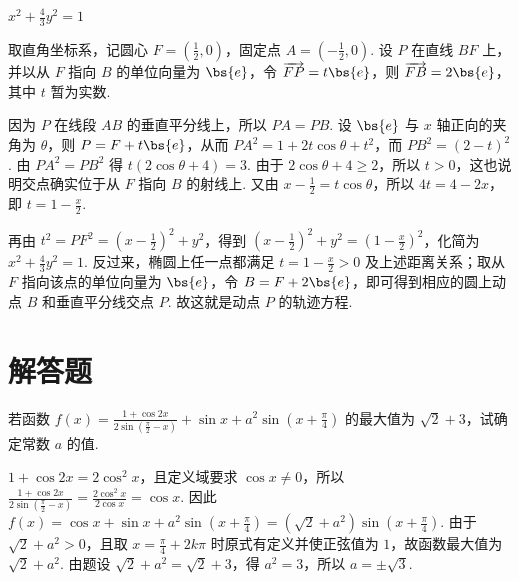 \begin{answer}
\(x^{2}+\frac{4}{3}y^{2}=1\)
\end{answer}

\begin{solution}
取直角坐标系，记圆心 \(F=\left(\frac12,0\right)\)，固定点 \(A=\left(-\frac12,0\right)\). 设 \(P\) 在直线 \(BF\) 上，并以从 \(F\) 指向 \(B\) 的单位向量为 \(\bs{e}\)，令 \(\overrightarrow{FP}=t\bs{e}\)，则 \(\overrightarrow{FB}=2\bs{e}\)，其中 \(t\) 暂为实数.

因为 \(P\) 在线段 \(AB\) 的垂直平分线上，所以 \(PA=PB\). 设 \(\bs{e}\) 与 \(x\) 轴正向的夹角为 \(\theta\)，则 \(P=F+t\bs{e}\)，从而 \(PA^2=1+2t\cos\theta+t^2\)，而 \(PB^2=(2-t)^2\). 由 \(PA^2=PB^2\) 得 \(t(2\cos\theta+4)=3\). 由于 \(2\cos\theta+4\geqslant2\)，所以 \(t>0\)，这也说明交点确实位于从 \(F\) 指向 \(B\) 的射线上. 又由 \(x-\frac12=t\cos\theta\)，所以 \(4t=4-2x\)，即 \(t=1-\frac{x}{2}\).

再由 \(t^2=PF^2=\left(x-\frac12\right)^2+y^2\)，得到 \(\left(x-\frac12\right)^2+y^2=\left(1-\frac{x}{2}\right)^2\)，化简为 \(x^2+\frac43y^2=1\). 反过来，椭圆上任一点都满足 \(t=1-\frac{x}{2}>0\) 及上述距离关系；取从 \(F\) 指向该点的单位向量为 \(\bs{e}\)，令 \(B=F+2\bs{e}\)，即可得到相应的圆上动点 \(B\) 和垂直平分线交点 \(P\). 故这就是动点 \(P\) 的轨迹方程.
\end{solution}

\section{解答题}
\begin{problem}
若函数 \( f(x) = \frac{1 + \cos 2x}{2\sin\left(\frac{\pi}{2} - x\right)} + \sin x + a^2 \sin \left(x + \frac{\pi}{4}\right) \) 的最大值为 \( \sqrt{2} + 3 \)，试确定常数 \( a \) 的值.

\begin{solution}
\(1+\cos2x=2\cos^2x\)，且定义域要求 \(\cos x\ne0\)，所以 \(\frac{1+\cos2x}{2\sin\left(\frac\pi2-x\right)}=\frac{2\cos^2x}{2\cos x}=\cos x\). 因此 \(f(x)=\cos x+\sin x+a^2\sin\left(x+\frac\pi4\right)=(\sqrt{2}+a^2)\sin\left(x+\frac\pi4\right)\). 由于 \(\sqrt{2}+a^2>0\)，且取 \(x=\frac\pi4+2k\pi\) 时原式有定义并使正弦值为 \(1\)，故函数最大值为 \(\sqrt{2}+a^2\). 由题设 \(\sqrt{2}+a^2=\sqrt{2}+3\)，得 \(a^2=3\)，所以 \(a=\pm\sqrt{3}\).
\end{solution}
\end{problem}

